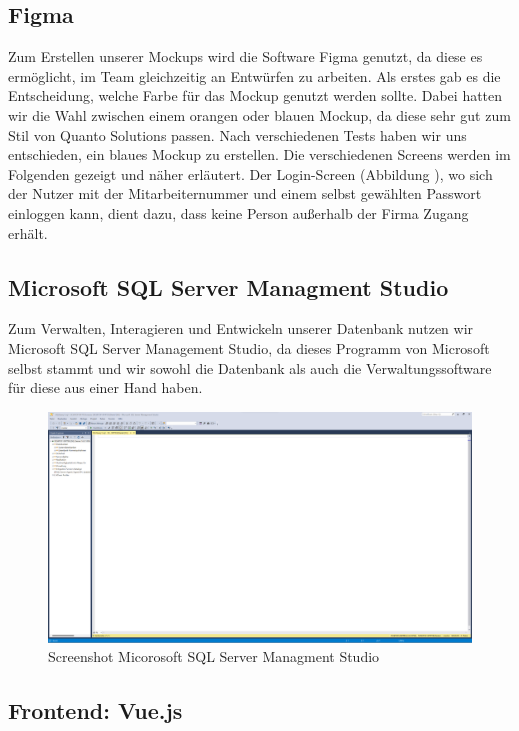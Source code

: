 \documentclass{article}
\begin{document}
    \subsection{Figma}
    Zum Erstellen unserer Mockups wird die Software Figma genutzt, da diese es ermöglicht, im Team gleichzeitig an Entwürfen zu arbeiten. Als erstes gab es die Entscheidung, welche Farbe für das Mockup genutzt werden sollte. Dabei hatten wir die Wahl zwischen einem orangen oder blauen Mockup, da diese sehr gut zum Stil von Quanto Solutions passen. Nach verschiedenen Tests haben wir uns entschieden, ein blaues Mockup zu erstellen. Die verschiedenen Screens werden im Folgenden gezeigt und näher erläutert. Der Login-Screen (Abbildung ), wo sich der Nutzer mit der Mitarbeiternummer und einem selbst gewählten Passwort einloggen kann, dient dazu, dass keine Person außerhalb der Firma Zugang erhält.

    \subsection{Microsoft SQL Server Managment Studio}
    Zum Verwalten, Interagieren und Entwickeln unserer Datenbank nutzen wir Microsoft SQL Server Management Studio, da dieses Programm von Microsoft selbst stammt und wir sowohl die Datenbank als auch die Verwaltungssoftware für diese aus einer Hand haben.

    \begin{figure}[h]
        \centering
        \includegraphics[width= \textwidth]{images/Microsoft SQL Server Management Studio.png}
        \caption{Screenshot Micorosoft SQL Server Managment Studio}
        \label{fig:beispiel}
    \end{figure}
    \subsection{Frontend: Vue.js}
\end{document}
